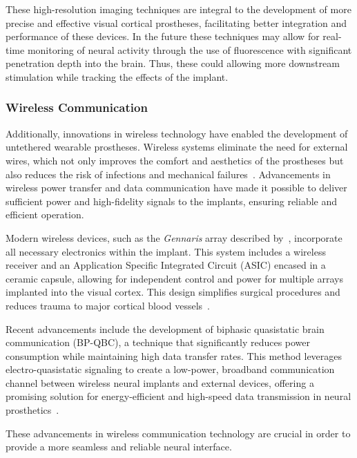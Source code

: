 \documentclass[twocolumn,10pt]{article}
\begin{document}
These high-resolution imaging techniques are integral to the development of more
precise and effective visual cortical prostheses, facilitating better
integration and performance of these devices. In the future these techniques may
allow for real-time monitoring of neural activity through the use of
fluorescence with significant penetration depth into the brain. Thus, these
could allowing more downstream stimulation while tracking the effects of the
implant.

\subsubsection*{Wireless Communication}
Additionally, innovations in wireless technology have enabled the development of
untethered wearable prostheses. Wireless systems eliminate the need for external
wires, which not only improves the comfort and aesthetics of the prostheses but
also reduces the risk of infections and mechanical
failures~\parencite{bruntonOptimisingElectrodeSurface2013}. Advancements in
wireless power transfer and data communication have made it possible to deliver
sufficient power and high-fidelity signals to the implants, ensuring reliable
and efficient operation.

Modern wireless devices, such as the \textit{Gennaris} array described
by~\textcite{rosenfeldTissueResponseChronically2020}, incorporate all necessary
electronics within the implant. This system includes a wireless receiver and an
Application Specific Integrated Circuit (ASIC) encased in a ceramic capsule,
allowing for independent control and power for multiple arrays implanted into
the visual cortex. This design simplifies surgical procedures and reduces trauma
to major cortical blood vessels~\parencite{polikovResponseBrainTissue2005}.

Recent advancements include the development of biphasic quasistatic brain
communication (BP-QBC), a technique that significantly reduces power consumption
while maintaining high data transfer rates. This method leverages
electro-quasistatic signaling to create a low-power, broadband communication
channel between wireless neural implants and external devices, offering a
promising solution for energy-efficient and high-speed data transmission in
neural prosthetics~\parencite{chatterjeeBiphasicQuasistaticBrain2023}.

These advancements in wireless communication technology are crucial in order to
provide a more seamless and reliable neural interface.
\end{document}
